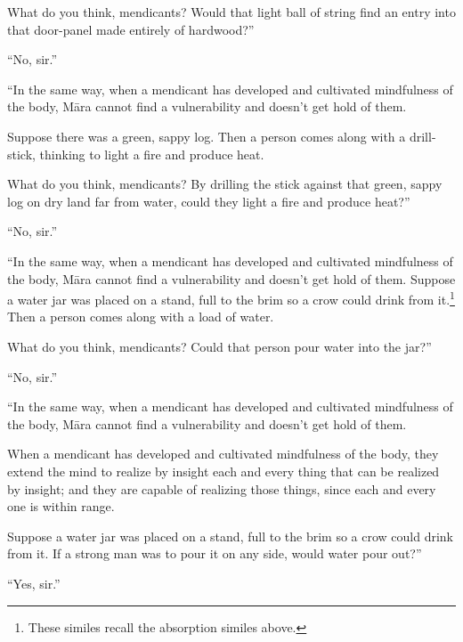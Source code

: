 \documentclass[12pt,openany]{book}%
\begin{document}
What do you think, mendicants? Would that light ball of string find an entry into that door-panel made entirely of hardwood?” 

“No, sir.” 

“In the same way, when a mendicant has developed and cultivated mindfulness of the body, \textsanskrit{Māra} cannot find a vulnerability and doesn’t get hold of them. 

Suppose there was a green, sappy log. Then a person comes along with a drill-stick, thinking to light a fire and produce heat. 

What do you think, mendicants? By drilling the stick against that green, sappy log on dry land far from water, could they light a fire and produce heat?” 

“No, sir.” 

“In the same way, when a mendicant has developed and cultivated mindfulness of the body, \textsanskrit{Māra} cannot find a vulnerability and doesn’t get hold of them. Suppose a water jar was placed on a stand, full to the brim so a crow could drink from it.\footnote{These similes recall the absorption similes above. } Then a person comes along with a load of water. 

What do you think, mendicants? Could that person pour water into the jar?” 

“No, sir.” 

“In the same way, when a mendicant has developed and cultivated mindfulness of the body, \textsanskrit{Māra} cannot find a vulnerability and doesn’t get hold of them. 

When a mendicant has developed and cultivated mindfulness of the body, they extend the mind to realize by insight each and every thing that can be realized by insight; and they are capable of realizing those things, since each and every one is within range. 

Suppose a water jar was placed on a stand, full to the brim so a crow could drink from it. If a strong man was to pour it on any side, would water pour out?” 

“Yes, sir.” 
\end{document}
